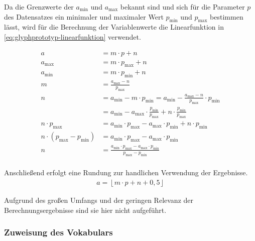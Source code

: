 Da die Grenzwerte der  $a_{\text{min}}$ und $a_{\text{max}}$ bekannt sind und sich für die Parameter $p$ des Datensatzes ein minimaler und maximaler Wert $p_{\text{min}}$ und $p_{\text{max}}$ bestimmen lässt, wird für die Berechnung der Variablenwerte die Linearfunktion in \autoref{eq:glyphprototyp-linearfunktion} verwendet.

\begin{equation}
\begin{aligned}\label{eq:glyphprototyp-linearfunktion}
a &= m \cdot p + n\\
a_{\text{max}} &= m \cdot p_{\text{max}} + n\\
a_{\text{min}} &= m \cdot p_{\text{min}} + n\\
m &= \boxed{\frac{a_{\text{max}} - n}{p_{\text{max}}}}\\
n &= a_{\text{min}} - m \cdot {p_{\text{min}}} = a_{\text{min}} - \frac{a_{\text{max}} - n}{p_{\text{max}}} \cdot p_{\text{min}}\\
&= a_{\text{min}} - a_{\text{max}} \cdot \frac {p_{\text{min}}}{p_{\text{max}}} + n \cdot \frac {p_{\text{min}}}{p_{\text{max}}}\\
n \cdot p_{\text{max}} &= a_{\text{min}} \cdot p_{\text{max}} - a_{\text{max}} \cdot p_{\text{min}} + n \cdot p_{\text{min}}\\
n \cdot \left( p_{\text{max}} - p_{\text{min}}\right) &= a_{\text{min}} \cdot p_{\text{max}} - a_{\text{max}} \cdot p_{\text{min}}\\
n &= \boxed{\frac{a_{\text{min}} \cdot p_{\text{max}} - a_{\text{max}} \cdot p_{\text{min}}}{p_{\text{max}} - p_{\text{min}}}}\\
\end{aligned}
\end{equation}

Anschließend erfolgt eine Rundung zur handlichen Verwendung der Ergebnisse.
\begin{align}\label{eq:glyphprototyp-rundung}
	a = \left\lfloor m \cdot p + n + 0,5 \right\rfloor
\end{align}

Aufgrund des großen Umfangs und der geringen Relevanz der Berechnungsergebnisse sind sie hier nicht aufgeführt.

\subsubsection*{Zuweisung des Vokabulars}

